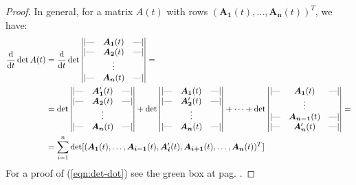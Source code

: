 \documentclass[../template.tex]{subfiles}
\begin{document}
\begin{proof}
    In general, for a matrix $A(t)$ with rows $(\bm{A_{1}}(t), \dots, \bm{A_{n}}(t))^T$, we have:    
    \begin{align} \nonumber
        \dv{t}\operatorname{det} A(t) &= \dv{t} \operatorname{det} \begin{vmatrix}
            \text{|---} & \bm{A_1}(t) & \text{---|} \\
            \text{|---} & \bm{A_2}(t) & \text{---|} \\
            & \vdots & \\
            \text{|---} & \bm{A_n}(t) & \text{---|} 
        \end{vmatrix} = \\ \nonumber
        &= \operatorname{det} \begin{vmatrix}
            \text{|---} & \bm{A_1}'(t) & \text{---|} \\
            \text{|---} & \bm{A_2}(t) & \text{---|} \\
            & \vdots & \\
            \text{|---} & \bm{A_n}(t) & \text{---|} 
        \end{vmatrix} + \operatorname{det} \begin{vmatrix}
            \text{|---} & \bm{A_1}(t) & \text{---|} \\
            \text{|---} & \bm{A_2}'(t) & \text{---|} \\
            & \vdots & \\
            \text{|---} & \bm{A_n}(t) & \text{---|} 
        \end{vmatrix} + \dots + \operatorname{det} \begin{vmatrix}
            \text{|---} & \bm{A_1}(t) & \text{---|} \\
            & \vdots & \\
            \text{|---} & \bm{A_{n-1}}(t) & \text{---|} \\
            \text{|---} & \bm{A_n}'(t) & \text{---|} 
        \end{vmatrix} = \\
        &= \sum_{i=1}^n \operatorname{det}[(\bm{A_1}(t), \dots, \bm{A_{i-1}}(t), \bm{A_i}'(t), \bm{A_{i+1}}(t), \dots, \bm{A_n}(t) )^T] \label{eqn:det-dot}
    \end{align}
    For a proof of (\ref{eqn:det-dot}) see the green box at pag. \pageref{proof:det-dot}.
    

\end{proof}
\end{document}
